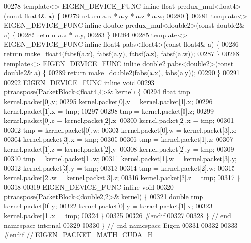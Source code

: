 \begin{DoxyCode}
00278 \textcolor{keyword}{template}<> EIGEN\_DEVICE\_FUNC \textcolor{keyword}{inline} \textcolor{keywordtype}{float}  predux\_mul<float4>(\textcolor{keyword}{const} float4& a) \{
00279   \textcolor{keywordflow}{return} a.x * a.y * a.z * a.w;
00280 \}
00281 \textcolor{keyword}{template}<> EIGEN\_DEVICE\_FUNC \textcolor{keyword}{inline} \textcolor{keywordtype}{double} predux\_mul<double2>(\textcolor{keyword}{const} double2& a) \{
00282   \textcolor{keywordflow}{return} a.x * a.y;
00283 \}
00284 
00285 \textcolor{keyword}{template}<> EIGEN\_DEVICE\_FUNC \textcolor{keyword}{inline} float4  pabs<float4>(\textcolor{keyword}{const} float4& a) \{
00286   \textcolor{keywordflow}{return} make\_float4(fabsf(a.x), fabsf(a.y), fabsf(a.z), fabsf(a.w));
00287 \}
00288 \textcolor{keyword}{template}<> EIGEN\_DEVICE\_FUNC \textcolor{keyword}{inline} double2 pabs<double2>(\textcolor{keyword}{const} double2& a) \{
00289   \textcolor{keywordflow}{return} make\_double2(fabs(a.x), fabs(a.y));
00290 \}
00291 
00292 EIGEN\_DEVICE\_FUNC \textcolor{keyword}{inline} \textcolor{keywordtype}{void}
00293 ptranspose(PacketBlock<float4,4>& kernel) \{
00294   \textcolor{keywordtype}{float} tmp = kernel.packet[0].y;
00295   kernel.packet[0].y = kernel.packet[1].x;
00296   kernel.packet[1].x = tmp;
00297 
00298   tmp = kernel.packet[0].z;
00299   kernel.packet[0].z = kernel.packet[2].x;
00300   kernel.packet[2].x = tmp;
00301 
00302   tmp = kernel.packet[0].w;
00303   kernel.packet[0].w = kernel.packet[3].x;
00304   kernel.packet[3].x = tmp;
00305 
00306   tmp = kernel.packet[1].z;
00307   kernel.packet[1].z = kernel.packet[2].y;
00308   kernel.packet[2].y = tmp;
00309 
00310   tmp = kernel.packet[1].w;
00311   kernel.packet[1].w = kernel.packet[3].y;
00312   kernel.packet[3].y = tmp;
00313 
00314   tmp = kernel.packet[2].w;
00315   kernel.packet[2].w = kernel.packet[3].z;
00316   kernel.packet[3].z = tmp;
00317 \}
00318 
00319 EIGEN\_DEVICE\_FUNC \textcolor{keyword}{inline} \textcolor{keywordtype}{void}
00320 ptranspose(PacketBlock<double2,2>& kernel) \{
00321   \textcolor{keywordtype}{double} tmp = kernel.packet[0].y;
00322   kernel.packet[0].y = kernel.packet[1].x;
00323   kernel.packet[1].x = tmp;
00324 \}
00325 
00326 \textcolor{preprocessor}{#endif}
00327 
00328 \} \textcolor{comment}{// end namespace internal}
00329 
00330 \} \textcolor{comment}{// end namespace Eigen}
00331 
00332 
00333 \textcolor{preprocessor}{#endif // EIGEN\_PACKET\_MATH\_CUDA\_H}
\end{DoxyCode}
